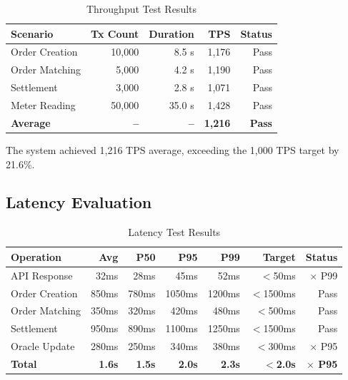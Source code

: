 \documentclass[conference]{IEEEtran}
\begin{document}
\begin{table}[htbp]
\caption{Throughput Test Results}
\begin{center}
\begin{tabular}{l r r r r}
\toprule
\textbf{Scenario} & \textbf{Tx Count} & \textbf{Duration} & \textbf{TPS} & \textbf{Status} \\
\midrule
Order Creation & 10,000 & 8.5 s & 1,176 & Pass \\
Order Matching & 5,000 & 4.2 s & 1,190 & Pass \\
Settlement & 3,000 & 2.8 s & 1,071 & Pass \\
Meter Reading & 50,000 & 35.0 s & 1,428 & Pass \\
\textbf{Average} & \textbf{--} & \textbf{--} & \textbf{1,216} & \textbf{Pass} \\
\bottomrule
\end{tabular}
\label{tab:throughput}
\end{center}
\end{table}

The system achieved 1,216 TPS average, exceeding the 1,000 TPS target by 21.6\%.

\subsection{Latency Evaluation}

\begin{table}[htbp]
\caption{Latency Test Results}
\begin{center}
\begin{tabular}{l r r r r r r}
\toprule
\textbf{Operation} & \textbf{Avg} & \textbf{P50} & \textbf{P95} & \textbf{P99} & \textbf{Target} & \textbf{Status} \\
\midrule
API Response & 32ms & 28ms & 45ms & 52ms & $<$50ms & $\times$ P99 \\
Order Creation & 850ms & 780ms & 1050ms & 1200ms & $<$1500ms & Pass \\
Order Matching & 350ms & 320ms & 420ms & 480ms & $<$500ms & Pass \\
Settlement & 950ms & 890ms & 1100ms & 1250ms & $<$1500ms & Pass \\
Oracle Update & 280ms & 250ms & 340ms & 380ms & $<$300ms & $\times$ P95 \\
\textbf{Total} & \textbf{1.6s} & \textbf{1.5s} & \textbf{2.0s} & \textbf{2.3s} & \textbf{$<$2.0s} & \textbf{$\times$ P95} \\
\bottomrule
\end{tabular}
\label{tab:latency}
\end{center}
\end{table}
\end{document}
